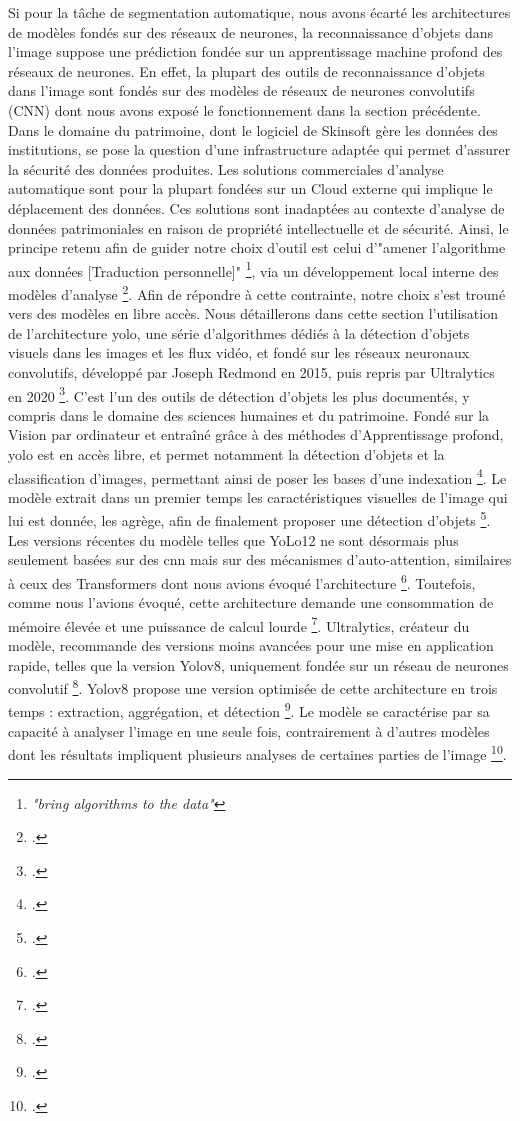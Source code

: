 Si pour la tâche de segmentation automatique, nous avons écarté les architectures de modèles fondés sur des réseaux de neurones, la reconnaissance d'objets dans l'image suppose une prédiction fondée sur un apprentissage machine profond des réseaux de neurones. En effet, la plupart des outils de reconnaissance d'objets dans l'image sont fondés sur des modèles de réseaux de neurones convolutifs (CNN) dont nous avons exposé le fonctionnement dans la section précédente. Dans le domaine du patrimoine, dont le logiciel de Skinsoft gère les données des institutions, se pose la question d'une infrastructure adaptée qui permet d'assurer la sécurité des données produites. Les solutions commerciales d'analyse automatique sont pour la plupart fondées sur un Cloud externe qui implique le déplacement des données. Ces solutions sont inadaptées au contexte d'analyse de données patrimoniales en raison de propriété intellectuelle et de sécurité. Ainsi, le principe retenu afin de guider notre choix d'outil est celui d'"amener l'algorithme aux données [Traduction personnelle]" \footnote{\textit{"bring algorithms to the data"}}, via un développement local interne des modèles d'analyse \footcite{noord2021}. Afin de répondre à cette contrainte, notre choix s'est trouné vers des modèles en libre accès. Nous détaillerons dans cette section l’utilisation de l’architecture \gls{yolo}, une série d’algorithmes dédiés à la détection d’objets visuels dans les images et les flux vidéo, et fondé sur les réseaux neuronaux convolutifs, développé par Joseph Redmond en 2015, puis repris par Ultralytics en 2020 \footcite{talbi2025}. 
C’est l’un des outils de détection d’objets les plus documentés, y compris dans le domaine des sciences humaines et du patrimoine. Fondé sur la \gls{Vision par ordinateur} et entraîné grâce à des méthodes d'\gls{Apprentissage profond}, \gls{yolo} est en accès libre, et permet notamment la détection d'objets et la classification d'images, permettant ainsi de poser les bases d’une indexation \footcite{jocher2022}. Le modèle extrait dans un premier temps les caractéristiques visuelles de l'image qui lui est donnée, les agrège, afin de finalement proposer une détection d'objets \footcite{norindr2023}. Les versions récentes du modèle telles que YoLo12 ne sont désormais plus seulement basées sur des \gls{cnn} mais sur des mécanismes d'auto-attention, similaires à ceux des \gls{Transformers} dont nous avions évoqué l'architecture \footcite{2025b}. Toutefois, comme nous l'avions évoqué, cette architecture demande une consommation de mémoire élevée et une puissance de calcul lourde \footcite{2025b}. Ultralytics, créateur du modèle, recommande des versions moins avancées pour une mise en application rapide, telles que la version Yolov8, uniquement fondée sur un réseau de neurones convolutif \footcite{2023c}. Yolov8 propose une version optimisée de cette architecture en trois temps : extraction, aggrégation, et détection \footcite{yaseen2024}. Le modèle se caractérise par sa capacité à analyser l'image en une seule fois, contrairement à d'autres modèles dont les résultats impliquent plusieurs analyses de certaines parties de l'image \footcite{redmon2016}.  
